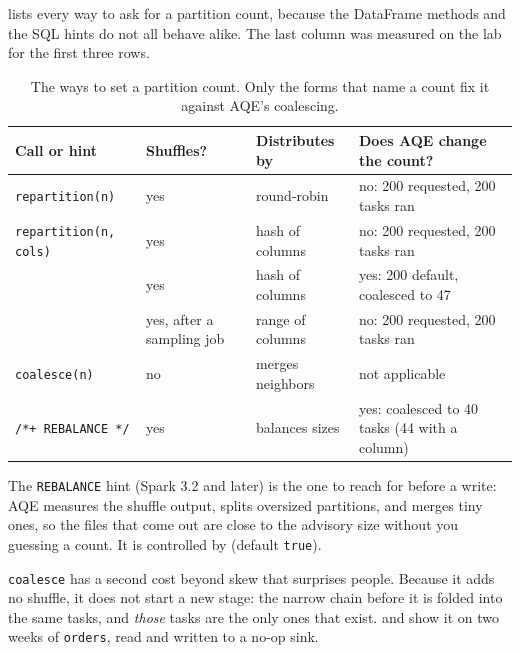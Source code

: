  lists every way to ask for a partition count,
because the DataFrame methods and the SQL hints do not all behave alike. The last
column was measured on the lab for the first three rows.

\begin{table}[htbp]
\centering\footnotesize
\renewcommand{\arraystretch}{1.25}
\begin{tabular}{@{}P{3.6cm}P{2.6cm}P{2.8cm}P{4.9cm}@{}}
\toprule
\textbf{Call or hint} & \textbf{Shuffles?} & \textbf{Distributes by} & \textbf{Does AQE change the count?} \\
\midrule
\texttt{repartition(n)} & yes & round-robin & no: 200 requested, 200 tasks ran \\
\texttt{repartition(n, cols)} & yes & hash of columns & no: 200 requested, 200 tasks ran \\
 & yes & hash of columns & yes: 200 default, coalesced to 47 \\
 & yes, after a sampling job & range of columns & no: 200 requested, 200 tasks ran \\
\texttt{coalesce(n)} & no & merges neighbors & not applicable \\
\texttt{/*+ REBALANCE */} & yes & balances sizes & yes: coalesced to 40 tasks (44 with a column) \\
\bottomrule
\end{tabular}
\caption{The ways to set a partition count. Only the forms that name a count
fix it against AQE's coalescing.}
\label{tab:pruning-repartition}
\end{table}

The \texttt{REBALANCE} hint (Spark 3.2 and later) is the one to reach for before
a write: AQE measures the shuffle output, splits oversized partitions, and merges
tiny ones, so the files that come out are close to the advisory size without you
guessing a count. It is controlled by
 (default
\texttt{true}).

\texttt{coalesce} has a second cost beyond skew that surprises people. Because it
adds no shuffle, it does not start a new stage: the narrow chain before it is
folded into the same tasks, and \emph{those} tasks are the only ones that exist.
 and  show it on two
weeks of \texttt{orders}, read and written to a no-op sink.


